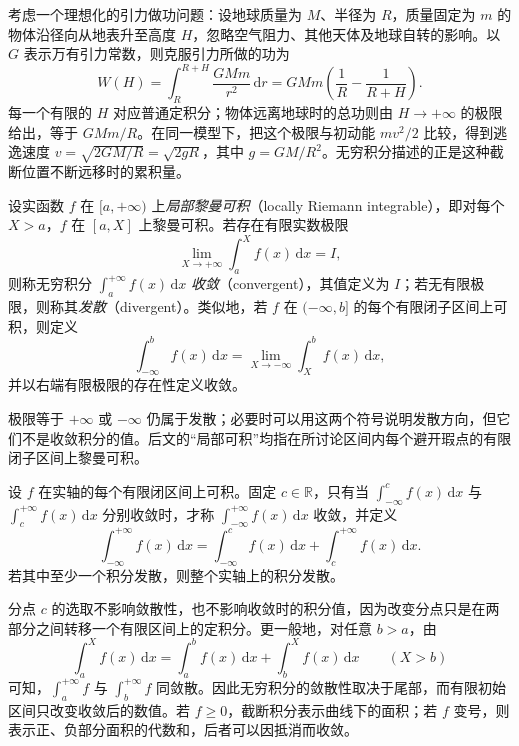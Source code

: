 \documentclass[UTF8,12pt,a4paper,fontset=fandol]{ctexbook}
\begin{document}
考虑一个理想化的引力做功问题：设地球质量为 $M$、半径为 $R$，质量固定为 $m$ 的物体沿径向从地表升至高度 $H$，忽略空气阻力、其他天体及地球自转的影响。以 $G$ 表示万有引力常数，则克服引力所做的功为
\[
    W(H)=\int_R^{R+H}\frac{GMm}{r^2}\,\mathrm{d}r
        =GMm\left(\frac1R-\frac1{R+H}\right).
\]
每一个有限的 $H$ 对应普通定积分；物体远离地球时的总功则由 $H\to+\infty$ 的极限给出，等于 $GMm/R$。在同一模型下，把这个极限与初动能 $mv^2/2$ 比较，得到逃逸速度 $v=\sqrt{2GM/R}=\sqrt{2gR}$，其中 $g=GM/R^2$。无穷积分描述的正是这种截断位置不断远移时的累积量。

\begin{definition}[无穷积分及其收敛性]
\label{def:improper-integrals-at-infinity}
设实函数 $f$ 在 $[a,+\infty)$ 上\emph{局部黎曼可积}（locally Riemann integrable），即对每个 $X>a$，$f$ 在 $[a,X]$ 上黎曼可积。若存在有限实数极限
\begin{equation}
    \lim_{X\to+\infty}\int_a^X f(x)\,\mathrm{d}x=I,
    \label{eq:improper-integral-right-limit}
\end{equation}
则称无穷积分 $\int_a^{+\infty}f(x)\,\mathrm{d}x$ \emph{收敛}（convergent），其值定义为 $I$；若无有限极限，则称其\emph{发散}（divergent）。类似地，若 $f$ 在 $(-\infty,b]$ 的每个有限闭子区间上可积，则定义
\[
    \int_{-\infty}^b f(x)\,\mathrm{d}x
    =\lim_{X\to-\infty}\int_X^b f(x)\,\mathrm{d}x,
\]
并以右端有限极限的存在性定义收敛。
\end{definition}

极限等于 $+\infty$ 或 $-\infty$ 仍属于发散；必要时可以用这两个符号说明发散方向，但它们不是收敛积分的值。后文的“局部可积”均指在所讨论区间内每个避开瑕点的有限闭子区间上黎曼可积。

\begin{definition}[整个实轴上的无穷积分]
\label{def:improper-integral-whole-line}
设 $f$ 在实轴的每个有限闭区间上可积。固定 $c\in\mathbb{R}$，只有当 $\int_{-\infty}^c f(x)\,\mathrm{d}x$ 与 $\int_c^{+\infty}f(x)\,\mathrm{d}x$ 分别收敛时，才称 $\int_{-\infty}^{+\infty}f(x)\,\mathrm{d}x$ 收敛，并定义
\begin{equation}
    \int_{-\infty}^{+\infty}f(x)\,\mathrm{d}x
    =\int_{-\infty}^c f(x)\,\mathrm{d}x
     +\int_c^{+\infty}f(x)\,\mathrm{d}x.
    \label{eq:improper-integral-whole-line-split}
\end{equation}
若其中至少一个积分发散，则整个实轴上的积分发散。
\end{definition}

分点 $c$ 的选取不影响敛散性，也不影响收敛时的积分值，因为改变分点只是在两部分之间转移一个有限区间上的定积分。更一般地，对任意 $b>a$，由
\[
    \int_a^X f(x)\,\mathrm{d}x
    =\int_a^b f(x)\,\mathrm{d}x+\int_b^X f(x)\,\mathrm{d}x
    \qquad(X>b)
\]
可知，$\int_a^{+\infty}f$ 与 $\int_b^{+\infty}f$ 同敛散。因此无穷积分的敛散性取决于尾部，而有限初始区间只改变收敛后的数值。若 $f\geq0$，截断积分表示曲线下的面积；若 $f$ 变号，则表示正、负部分面积的代数和，后者可以因抵消而收敛。
\end{document}
